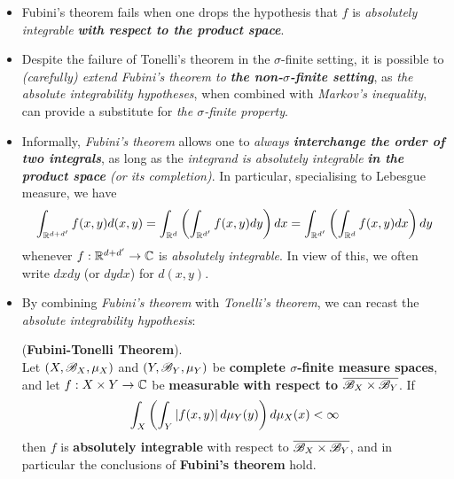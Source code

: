\documentclass[11pt]{article}
\begin{document}
\begin{itemize}
\item \begin{remark}
Fubini's theorem fails when one drops the hypothesis that $f$ is \emph{absolutely integrable \textbf{with respect to the product space}}.
\end{remark}

\item \begin{remark}
Despite the failure of Tonelli's theorem in the $\sigma$-finite setting, it is possible to \emph{(carefully) extend Fubini's theorem to \textbf{the non-$\sigma$-finite setting}}, as \emph{the absolute integrability hypotheses}, when combined with \emph{Markov's inequality}, can provide a substitute for \emph{the $\sigma$-finite property}.
\end{remark}

\item \begin{remark}
Informally, \emph{Fubini's theorem} allows one to \emph{always \textbf{interchange the order of two integrals}}, as long as the \emph{integrand is absolutely integrable} \emph{\textbf{in the product space} (or its completion)}. In particular, specialising to Lebesgue measure, we have
\begin{align*}
\int_{{\mathbb R}^{d+d'}}f(x,y) d(x,y) = \int_{{\mathbb R}^d}\left(\int_{{\mathbb R}^{d'}} f(x, y)dy\right) dx = \int_{{\mathbb R}^{d'}}\left(\int_{{\mathbb R}^{d}} f(x, y)dx\right) dy
\end{align*}
whenever $f: {\mathbb R}^{d+d'} \to {\mathbb C}$ is \emph{absolutely integrable}. In view of this, we often write $dxdy$ (or $dydx$) for $d(x, y)$.
\end{remark}

\item By combining \emph{Fubini's theorem} with \emph{Tonelli's theorem}, we can recast the \emph{absolute integrability hypothesis}:
\begin{corollary} (\textbf{Fubini-Tonelli Theorem}). \citep{tao2011introduction}\\
Let $(X, {\mathscr B}_X, \mu_X)$ and $(Y, {\mathscr B}_Y, \mu_Y)$ be \textbf{complete $\sigma$-finite measure spaces}, and let $f: X \times Y \to {\mathbb C}$ be \textbf{measurable} \textbf{with respect to} $\overline{{\mathscr B}_X \times {\mathscr B}_Y}$.  If
\begin{align*}
 \int_X\left(\int_Y \left\lvert f(x, y) \right\rvert d\mu_Y(y)\right) d\mu_X(x) < \infty
\end{align*} then $f$ is \textbf{absolutely integrable} with respect to $\overline{{\mathscr B}_X \times {\mathscr B}_Y}$, and in particular the
conclusions of \textbf{Fubini's theorem} hold. 


\end{corollary}
\end{itemize}
\end{document}
